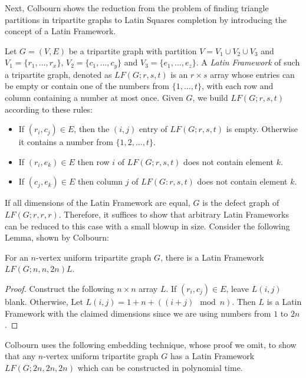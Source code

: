 \documentclass[runningheads,a4paper]{llncs}
\begin{document}
Next, Colbourn shows the reduction from the problem of finding triangle partitions in tripartite graphs to Latin Squares completion by introducing the concept of a Latin Framework. 

\begin{definition} 
Let $G = (V, E)$ be a tripartite graph with partition $V = V_1 \cup V_2 \cup V_3$ and $V_1 = \{r_1,...,r_x\}$, $V_2 = \{c_1,...,c_y\}$ and $V_3 = \{e_1,...,e_z\}$. A \emph{Latin Framework} of such a tripartite graph, denoted as $LF(G;r,s,t)$ is an $r \times s$ array whose entries can be empty or contain one of the numbers from $\{1, ... ,t \}$, with each row and column containing a number at most once. Given $G$, we build $LF(G;r,s,t)$ according to these rules: 

\begin{itemize}
	\item If $(r_i, c_j) \in E$, then the $(i,j)$ entry of $LF(G;r,s,t)$ is empty. Otherwise it contains a number from $\{1,2,...,t\}$. 
	\item If $(r_i, e_k) \in E$ then row $i$ of $LF(G;r,s,t)$ does not contain element $k$. 
	\item If $(c_j, e_k) \in E$ then column $j$ of $LF(G:r,s,t)$ does not contain element $k$. 
\end{itemize}
\end{definition}

If all dimensions of the Latin Framework are equal, $G$ is the defect graph of $LF(G;r ,r, r)$. Therefore, it suffices to show that arbitrary Latin Frameworks can be reduced to this case with a small blowup in size. Consider the following Lemma, shown by Colbourn: 

\begin{lemma}
For an $n$-vertex uniform tripartite graph $G$, there is a Latin Framework $LF(G;n,n,2n) L$. 
\end{lemma} 

\begin{proof}
Construct the following $n \times n$ array $L$. If $(r_i, c_j) \in E$, leave $L(i,j)$ blank. Otherwise, Let $L(i,j) = 1 + n + ((i+j) \mod n)$. Then $L$ is a Latin Framework with the claimed dimensions since we are using numbers from $1$ to $2n$. 
\end{proof}

Colbourn uses the following embedding technique, whose proof we omit, to show that any $n$-vertex uniform tripartite graph $G$ has a Latin Framework $LF(G;2n,2n,2n)$ which can be constructed in polynomial time. 
\end{document}
